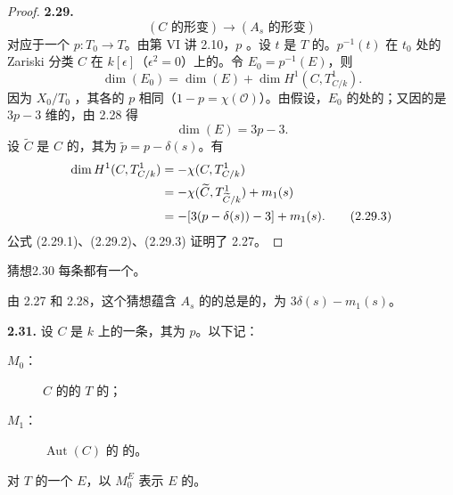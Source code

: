 \begin{proof}
\textbf{2.29.} 
\[
(C\text{ 的形变})\longrightarrow(A_s\text{ 的形变})
\]
对应于一个 $p:T_0\to T$。由第 VI 讲 2.10，$p$ 。设 $t$ 是 $T$ 的。$p^{-1}(t)$ 在 $t_0$ 处的 Zariski 分类 $C$ 在 $k[\epsilon]$（$\epsilon^2=0$）上的。令 $E_0=p^{-1}(E)$，则
\[
\dim(E_0)=\dim(E)+\dim H^1(C,T^1_{C/k}).\tag{2.29.1}
\]
因为 $X_0/T_0$ ，其各的 $p$ 相同（$1-p=\chi(\mathcal O)$）。由假设，$E_0$ 的处的；又因的是 $3p-3$ 维的，由 2.28 得
\[
\dim(E)=3p-3.\tag{2.29.2}
\]
设 $\widetilde C$ 是 $C$ 的，其为 $\widetilde p=p-\delta(s)$。有
\begin{align}
\dim H^1(C,T^1_{C/k})&=-\chi(C,T^1_{C/k})\notag\\
&=-\chi(\widetilde C,T^1_{\widetilde C/k})+m_1(s)\notag\\
&=-[3(p-\delta(s))-3]+m_1(s).\tag{2.29.3}
\end{align}
公式 (2.29.1)、(2.29.2)、(2.29.3) 证明了 2.27。
\end{proof}

\begin{SGAresult}{猜想}{2.30}
每条都有一个。
\end{SGAresult}
由 2.27 和 2.28，这个猜想蕴含 $A_s$ 的的总是的，为 $3\delta(s)-m_1(s)$。

\textbf{2.31.} 设 $C$ 是 $k$ 上的一条，其为 $p$。以下记：
\begin{description}
\item[$M_0$：] $C$ 的的 $T$ 的；
\item[$M_1$：] $\operatorname{Aut}(C)$ 的 的。
\end{description}
对 $T$ 的一个 $E$，以 $M_0^E$ 表示 $E$ 的。

